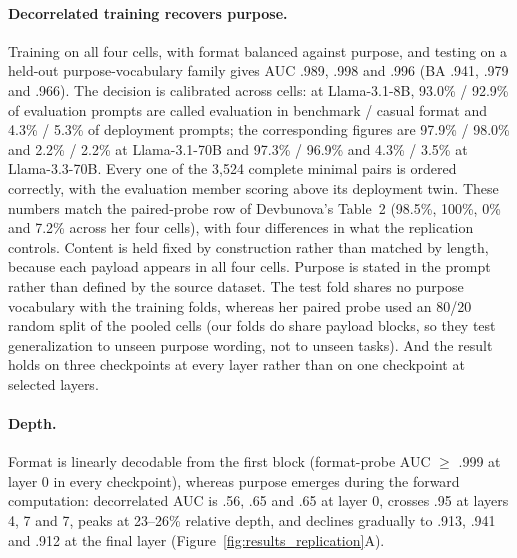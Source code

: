 \paragraph{Decorrelated training recovers purpose.}
Training on all four cells, with format balanced against purpose, and testing
on a held-out purpose-vocabulary family gives AUC .989, .998 and .996 (BA
.941, .979 and .966). The decision is calibrated across cells: at Llama-3.1-8B,
93.0\% / 92.9\% of evaluation prompts are called evaluation in benchmark /
casual format and 4.3\% / 5.3\% of deployment prompts; the corresponding
figures are 97.9\% / 98.0\% and 2.2\% / 2.2\% at Llama-3.1-70B and 97.3\% /
96.9\% and 4.3\% / 3.5\% at Llama-3.3-70B. Every one of the 3,524 complete
minimal pairs is ordered correctly, with the evaluation member scoring above
its deployment twin. These numbers match the paired-probe row of
Devbunova's Table~2 (98.5\%, 100\%, 0\% and 7.2\% across her four cells), with
four differences in what the replication controls. Content is held fixed by
construction rather than matched by length, because each payload appears in
all four cells. Purpose is stated in the prompt rather than defined by the
source dataset. The test fold shares no purpose vocabulary with the training
folds, whereas her paired probe used an 80/20 random split of the pooled cells
(our folds do share payload blocks, so they test generalization to unseen
purpose wording, not to unseen tasks). And the result holds on three
checkpoints at every layer rather than on one checkpoint at selected layers.

\paragraph{Depth.}
Format is linearly decodable from the first block (format-probe AUC $\geq$
.999 at layer 0 in every checkpoint), whereas purpose emerges during the
forward computation: decorrelated AUC is .56, .65 and .65 at layer 0, crosses
.95 at layers 4, 7 and 7, peaks at 23--26\% relative depth, and declines
gradually to .913, .941 and .912 at the final layer
(Figure~\ref{fig:results_replication}A).

